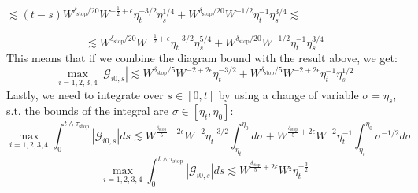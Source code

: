 \documentclass[11pt]{article}
\newcommand{\sto}{\text{stop}}
\begin{document}
\begin{center}
$\lesssim  (t-s) W^{\delta_\sto/20}W^{-\frac{1}{2}+\epsilon}\eta_t^{-3/2}\eta_s^{1/4} + W^{\delta_\sto/20}W^{-1/2}\eta_t^{-1}\eta_s^{3/4}\lesssim$
\end{center}
$$\lesssim W^{\delta_\sto/20}W^{-\frac{1}{2}+\epsilon}\eta_t^{-3/2}\eta_s^{5/4} + W^{\delta_\sto/20}W^{-1/2}\eta_t^{-1}\eta_s^{3/4}$$
This means that if we combine the diagram bound with the result above, we get: 
$$\max_{i=1, 2, 3, 4}|\mathcal{G}_{i0, s}|\lesssim W^{\delta_\sto/5}W^{-2+2\epsilon}\eta_t^{-3/2} + W^{\delta_\sto/5}W^{-2+2\epsilon}\eta_t^{-1}\eta_s^{1/2}$$
Lastly, we need to integrate over $s\in [0, t]$ by using a change of variable $\sigma =\eta_s$, s.t. the bounds of the integral are $\sigma\in [\eta_t, \eta_0]$:
$$\max_{i=1, 2, 3, 4} \int_0^{t\wedge \tau_\sto}|\mathcal{G}_{i0, s}|ds\lesssim W^{\frac{\delta_\sto}{5}+2\epsilon} W^{-2}\eta_t^{-3/2} \int_{\eta_t}^{\eta_0}d\sigma + W^{\frac{\delta_\sto}{5}+2\epsilon}W^{-2}\eta_t^{-1}\int_{\eta_t}^{\eta_0}\sigma^{-1/2}d\sigma $$
$$\max_{i=1, 2, 3, 4} \int_0^{t\wedge \tau_\sto}|\mathcal{G}_{i0, s}|ds\lesssim W^{\frac{\delta_\sto}{5}+2\epsilon} W^{_2}\eta_t^{-\frac{3}{2}}$$
\end{document}
